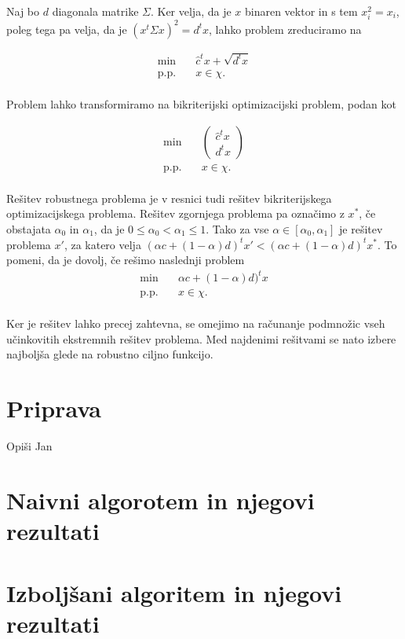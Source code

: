\documentclass[a4paper, 12 pt]{article}
\theoremstyle{definition} %
\theoremstyle{plain} %
\theoremstyle{definition}
\begin{document}
Naj bo $d$ diagonala matrike $\Sigma$.
Ker velja, da je $x$ binaren vektor in s tem $x_{i}^2=x_{i}$, poleg tega pa velja, da je $(x^t  \Sigma x)^2 = d^tx$, lahko problem zreduciramo na

\begin{equation*}
\begin{aligned}
\min \quad &  \hat{c}^t x +\sqrt{d^tx}\\
\textrm{p.p.} \quad & x \in \chi.\\
\end{aligned}
\end{equation*}

Problem lahko transformiramo na bikriterijski optimizacijski problem, podan kot

\begin{equation*}
\begin{aligned}
\min \quad &  \begin{pmatrix} \hat{c}^t x \\ d^tx \end{pmatrix} \\
\textrm{p.p.} \quad & x \in \chi.\\
\end{aligned}
\end{equation*}

Rešitev robustnega problema je v resnici tudi rešitev bikriterijskega optimizacijskega problema. Rešitev zgornjega problema pa označimo z $x^*$, če obstajata  $\alpha_{0}$ in $\alpha_{1}$, da je $0 \le \alpha_{0} < \alpha_{1} \le 1$. Tako za vse $\alpha \in [\alpha_{0},\alpha_{1}]$ je rešitev problema $x'$, za katero velja $(\alpha c + (1 - \alpha)d)^tx' < (\alpha c + (1- \alpha)d)^tx^{*}$.\newline
 To pomeni, da je dovolj, če rešimo naslednji problem
\begin{equation*}
\begin{aligned}
\min \quad &  \alpha c + (1 - \alpha)d)^tx \\
\textrm{p.p.} \quad & x \in \chi.\\
\end{aligned}
\end{equation*}

Ker je rešitev lahko precej zahtevna, se omejimo na računanje podmnožic vseh učinkovitih ekstremnih rešitev problema. Med najdenimi rešitvami se nato izbere najboljša glede na robustno ciljno funkcijo.




\section{Priprava}
Opiši Jan

\section{Naivni algorotem in njegovi rezultati}

\section{Izboljšani algoritem in njegovi rezultati}
\end{document}
